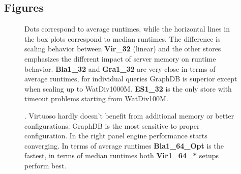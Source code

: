\documentclass[twocolumn]{bmcart}%
\def\texttt{[image: ]}
\begin{document}
\begin{backmatter}

\section*{Figures}

  
\begin{figure}[ht!]
	\centering
	\caption{  Dots correspond to average runtimes, while the horizontal lines in the box plots correspond to median runtimes. The difference is scaling behavior between \textbf{Vir\_32} (linear) and the other stores emphasizes the different impact of server memory on runtime behavior. \textbf{Bla1\_32} and \textbf{Gra1\_32} are very close in terms of average runtimes, for individual queries GraphDB is superior except when scaling up to WatDiv1000M. \textbf{ES1\_32} is the only store with timeout problems starting from WatDiv100M. }
	\label{fig:Fig01_WatdivNoSQLDataScaling}
\end{figure} 
   
\begin{figure}[ht!]
	\centering
	\caption{. Virtuoso hardly doesn't benefit from additional memory or better configurations. GraphDB is the most sensitive to proper configuration. In the right panel engine performance starts converging. In terms of average runtimes \textbf{Bla1\_64\_Opt} is the fastest, in terms of median runtimes both \textbf{Vir1\_64\_*} setups perform best.}
	\label{fig:Fig02_WatdivVerticalScaling}
\end{figure}


\end{backmatter}
\end{document}
